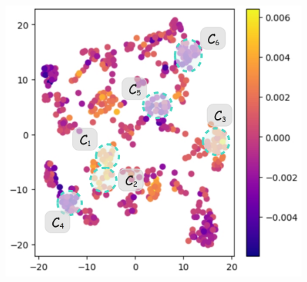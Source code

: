 \documentclass{article} %
\begin{document}

\begin{figure}
  \begin{minipage}[h]{0.5\linewidth}
    \centering
    \includegraphics[scale=0.091]{intro-figure-new1.png}
    \label{fig1}
  \end{minipage}%
  \begin{minipage}[h]{0.5\linewidth}
    \centering

\end{minipage}
\end{figure}
\end{document}
